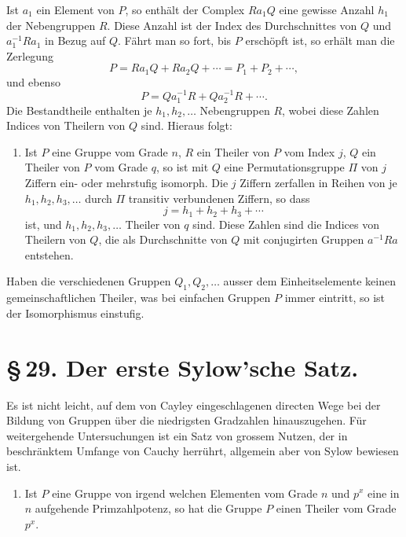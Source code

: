 \documentclass[11pt]{article}
\begin{document}
Ist $a_1$ ein Element von $P$, so enthält der Complex $Ra_1Q$ eine gewisse Anzahl $h_1$ der Nebengruppen $R$. Diese Anzahl ist der Index des Durchschnittes von $Q$ und $a_1^{-1}Ra_1$ in Bezug auf $Q$. Fährt man so fort, bis $P$ erschöpft ist, so erhält man die Zerlegung
\begin{equation}
P=Ra_1Q+Ra_2Q+\cdots=P_1+P_2+\cdots,
\tag{9}
\end{equation}
und ebenso
\begin{equation}
P=Qa_1^{-1}R+Qa_2^{-1}R+\cdots .
\tag{10}
\end{equation}
Die Bestandtheile enthalten je $h_1,h_2,\ldots$ Nebengruppen $R$, wobei diese Zahlen Indices von Theilern von $Q$ sind. Hieraus folgt:
\begin{enumerate}[label=\arabic*.,leftmargin=2.2em,start=3]
\item Ist $P$ eine Gruppe vom Grade $n$, $R$ ein Theiler von $P$ vom Index $j$, $Q$ ein Theiler von $P$ vom Grade $q$, so ist mit $Q$ eine Permutationsgruppe $\Pi$ von $j$ Ziffern ein- oder mehrstufig isomorph. Die $j$ Ziffern zerfallen in Reihen von je $h_1,h_2,h_3,\ldots$ durch $\Pi$ transitiv verbundenen Ziffern, so dass
\[
j=h_1+h_2+h_3+\cdots
\tag{11}
\]
ist, und $h_1,h_2,h_3,
\ldots$ Theiler von $q$ sind. Diese Zahlen sind die Indices von Theilern von $Q$, die als Durchschnitte von $Q$ mit conjugirten Gruppen $a^{-1}Ra$ entstehen.
\end{enumerate}
Haben die verschiedenen Gruppen $Q_1,Q_2,\ldots$ ausser dem Einheitselemente keinen gemeinschaftlichen Theiler, was bei einfachen Gruppen $P$ immer eintritt, so ist der Isomorphismus einstufig.

\section*{\S\,29. Der erste Sylow'sche Satz.}

Es ist nicht leicht, auf dem von Cayley eingeschlagenen directen Wege bei der Bildung von Gruppen über die niedrigsten Gradzahlen hinauszugehen. Für weitergehende Untersuchungen ist ein Satz von grossem Nutzen, der in beschränktem Umfange von Cauchy herrührt, allgemein aber von Sylow bewiesen ist.

\begin{enumerate}[label=\Roman*.,leftmargin=2.4em]
\item Ist $P$ eine Gruppe von irgend welchen Elementen vom Grade $n$ und $p^x$ eine in $n$ aufgehende Primzahlpotenz, so hat die Gruppe $P$ einen Theiler vom Grade $p^x$.
\end{enumerate}
\end{document}
